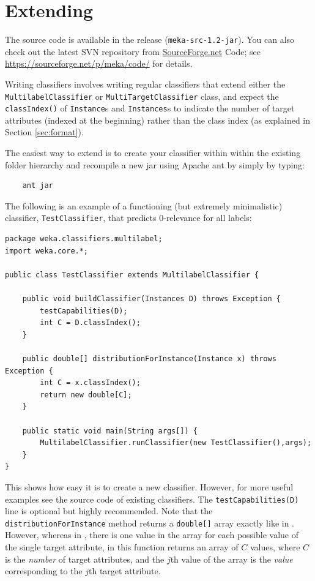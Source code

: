 \documentclass[11pt]{article}
\newcommand{\MEKA}{Meka}
\newcommand{\WEKA}{Weka}
\def\version{{\tt 1.2}}
\begin{document}
\section{\label{sec:extending}Extending \framework{\MEKA}}%

The source code is available in the release (\texttt{meka-src-\version-jar}). You can also check out the latest SVN repository from \url{SourceForge.net} \textsf{Code}; see \url{https://sourceforge.net/p/meka/code/} for details. 

Writing \framework{\MEKA} classifiers involves writing regular \framework{\WEKA} classifiers that extend either the \texttt{MultilabelClassifier} or \texttt{MultiTargetClassifier} class, and expect the \texttt{classIndex()} of \texttt{Instance}s and \texttt{Instances}s to indicate the number of target attributes (indexed at the beginning) rather than the class index (as explained in Section \ref{sec:format}). 

The easiest way to extend \framework{\MEKA} is to create your classifier within within the existing \framework{\MEKA} folder hierarchy and recompile a new jar using Apache ant by simply by typing:
\begin{verbatim}
	ant jar
\end{verbatim}

The following is an example of a functioning (but extremely minimalistic) classifier, \texttt{TestClassifier}, that predicts $0$-relevance for all labels:

{\small
\begin{verbatim}
package weka.classifiers.multilabel;
import weka.core.*;

public class TestClassifier extends MultilabelClassifier {
	
    public void buildClassifier(Instances D) throws Exception {
        testCapabilities(D);
        int C = D.classIndex();
    }
    
    public double[] distributionForInstance(Instance x) throws Exception {
        int C = x.classIndex();
       	return new double[C];
    }
    
    public static void main(String args[]) {
        MultilabelClassifier.runClassifier(new TestClassifier(),args);
    }
}
\end{verbatim}
}

This shows how easy it is to create a new classifier. However, for more useful examples see the source code of existing \framework{\MEKA} classifiers. The \texttt{testCapabilities(D)} line is optional but highly recommended. Note that the \texttt{distributionForInstance} method returns a \texttt{double[]} array exactly like in \framework{\WEKA}. However, whereas in \framework{\WEKA}, there is one value in the array for each possible value of the single target attribute, in \framework{\MEKA} this function returns an array of $C$ values, where $C$ is the \emph{number} of target attributes, and the $j$th value of the array is the \emph{value} corresponding to the $j$th target attribute.
\end{document}

